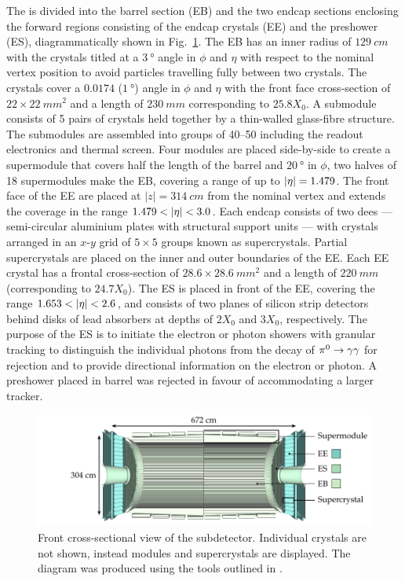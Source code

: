 The \ECAL is divided into the barrel section (EB) and the two endcap sections enclosing the forward regions consisting of the endcap crystals (EE) and the preshower (ES), diagrammatically shown in Fig.~\ref{fig:cms-ecal}. The EB has an inner radius of ${\SI{129}{cm}}$ with the crystals titled at a ${\SI{3}{\degree}}$ angle in $\phi$ and $\eta$ with respect to the nominal vertex position to avoid particles travelling fully between two crystals. The crystals cover a $0.0174$ (${\SI{1}{\degree}}$) angle in $\phi$ and $\eta$ with the front face cross-section of ${22\times\SI{22}{mm^{2}}}$ and a length of ${\SI{230}{mm}}$ corresponding to $25.8X_0$. A submodule consists of 5 pairs of crystals held together by a thin-walled glass-fibre structure. The submodules are assembled into groups of 40--50 including the readout electronics and thermal screen.  Four modules are placed side-by-side to create a supermodule that covers half the length of the barrel and ${\SI{20}{\degree}}$ in $\phi$, two halves of 18 supermodules make the EB, covering a range of up to ${|\eta|=1.479}$. The front face of the EE are placed at ${|z|=\SI{314}{cm}}$ from the nominal vertex and extends the \ECAL coverage in the range ${1.479<\aeta<3.0}$. Each endcap consists of two dees --- semi-circular aluminium plates with structural support units --- with crystals arranged in an $x$-$y$ grid of $5\times 5$ groups known as supercrystals. Partial supercrystals are placed on the inner and outer boundaries of the EE. Each EE crystal has a frontal cross-section of ${28.6\times\SI{28.6}{mm^{2}}}$ and a length of ${\SI{220}{mm}}$ (corresponding to $24.7X_0$). The ES is placed in front of the EE, covering the range $1.653<\aeta<2.6$, and consists of two planes of silicon strip detectors behind disks of lead absorbers at depths of $2X_0$ and $3X_0$, respectively. The purpose of the ES is to initiate the electron or photon showers with granular tracking to distinguish the individual photons from the decay of ${\pi^{0}\rightarrow\gamma\gamma}$ for rejection and to provide directional information on the electron or photon. A preshower placed in barrel was rejected in favour of accommodating a larger tracker.

\begin{figure}[htb]
    \centering
    \includegraphics{diagrams/tikz/cms/annotated/cms_ecal.pdf}
    \caption[Front cross-section of the ECAL subdetector]{
        Front cross-sectional view of the \ECAL subdetector. Individual crystals are not shown, instead modules and supercrystals are displayed. The diagram was produced using the tools outlined in \cite{Sakuma:2013jqa}.
    }
    \label{fig:cms-ecal}
\end{figure}

